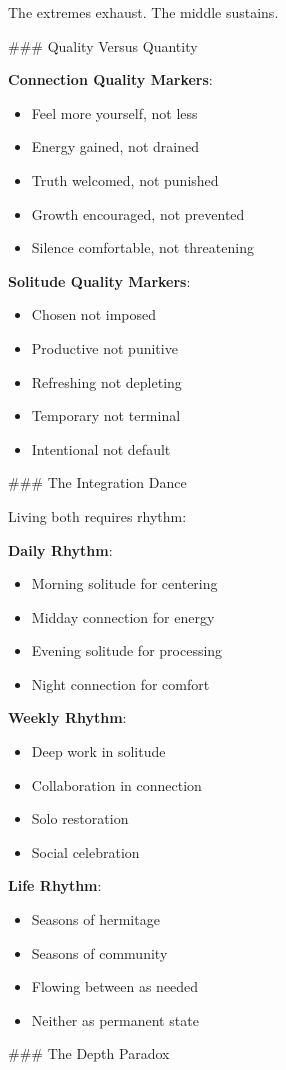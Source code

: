 \documentclass[12pt]{book}
\begin{document}
The extremes exhaust. The middle sustains.

\#\#\# Quality Versus Quantity

\textbf{Connection Quality Markers}:
\begin{itemize}
\item Feel more yourself, not less
\item Energy gained, not drained
\item Truth welcomed, not punished
\item Growth encouraged, not prevented
\item Silence comfortable, not threatening

\end{itemize}
\textbf{Solitude Quality Markers}:
\begin{itemize}
\item Chosen not imposed
\item Productive not punitive
\item Refreshing not depleting
\item Temporary not terminal
\item Intentional not default

\end{itemize}
\#\#\# The Integration Dance

Living both requires rhythm:

\textbf{Daily Rhythm}:
\begin{itemize}
\item Morning solitude for centering
\item Midday connection for energy
\item Evening solitude for processing
\item Night connection for comfort

\end{itemize}
\textbf{Weekly Rhythm}:
\begin{itemize}
\item Deep work in solitude
\item Collaboration in connection
\item Solo restoration
\item Social celebration

\end{itemize}
\textbf{Life Rhythm}:
\begin{itemize}
\item Seasons of hermitage
\item Seasons of community
\item Flowing between as needed
\item Neither as permanent state

\end{itemize}
\#\#\# The Depth Paradox
\end{document}
